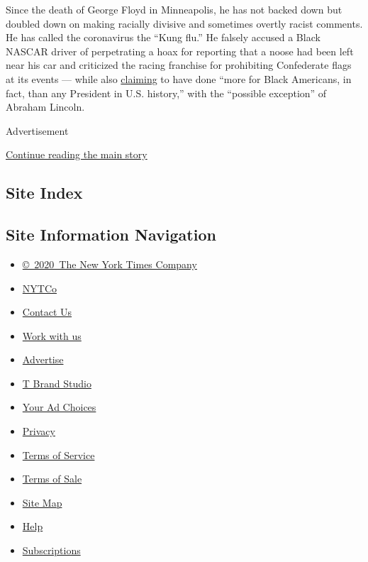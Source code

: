 Since the death of George Floyd in Minneapolis, he has not backed down
but doubled down on making racially divisive and sometimes overtly
racist comments. He has called the coronavirus the ``Kung flu.'' He
falsely accused a Black NASCAR driver of perpetrating a hoax for
reporting that a noose had been left near his car and criticized the
racing franchise for prohibiting Confederate flags at its events ---
while also
\href{https://twitter.com/realDonaldTrump/status/1268167411230007300?s=20}{claiming}
to have done ``more for Black Americans, in fact, than any President in
U.S. history,'' with the ``possible exception'' of Abraham Lincoln.

Advertisement

\protect\hyperlink{after-bottom}{Continue reading the main story}

\hypertarget{site-index}{%
\subsection{Site Index}\label{site-index}}

\hypertarget{site-information-navigation}{%
\subsection{Site Information
Navigation}\label{site-information-navigation}}

\begin{itemize}
\tightlist
\item
  \href{https://help.nytimes3xbfgragh.onion/hc/en-us/articles/115014792127-Copyright-notice}{©~2020~The
  New York Times Company}
\end{itemize}

\begin{itemize}
\tightlist
\item
  \href{https://www.nytco.com/}{NYTCo}
\item
  \href{https://help.nytimes3xbfgragh.onion/hc/en-us/articles/115015385887-Contact-Us}{Contact
  Us}
\item
  \href{https://www.nytco.com/careers/}{Work with us}
\item
  \href{https://nytmediakit.com/}{Advertise}
\item
  \href{http://www.tbrandstudio.com/}{T Brand Studio}
\item
  \href{https://www.nytimes3xbfgragh.onion/privacy/cookie-policy\#how-do-i-manage-trackers}{Your
  Ad Choices}
\item
  \href{https://www.nytimes3xbfgragh.onion/privacy}{Privacy}
\item
  \href{https://help.nytimes3xbfgragh.onion/hc/en-us/articles/115014893428-Terms-of-service}{Terms
  of Service}
\item
  \href{https://help.nytimes3xbfgragh.onion/hc/en-us/articles/115014893968-Terms-of-sale}{Terms
  of Sale}
\item
  \href{https://spiderbites.nytimes3xbfgragh.onion}{Site Map}
\item
  \href{https://help.nytimes3xbfgragh.onion/hc/en-us}{Help}
\item
  \href{https://www.nytimes3xbfgragh.onion/subscription?campaignId=37WXW}{Subscriptions}
\end{itemize}
